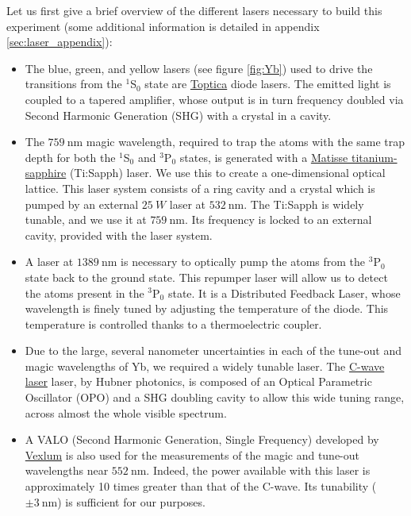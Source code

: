 \documentclass[11pt]{article}
\numberwithin{equation}{section}
\numberwithin{figure}{section}
\begin{document}
Let us first give a brief overview of the different lasers necessary to build this experiment (some additional information is detailed in appendix \ref{sec:laser_appendix}):
\begin{itemize}
	\item The blue, green, and yellow lasers (see figure  \ref{fig:Yb}) used to drive the transitions from the $^1$S$_0$ state are \href{https://www.toptica.com/products/tunable-diode-lasers/frequency-converted-lasers/ta-shg-pro}{Toptica} diode lasers. The emitted light is coupled to a tapered amplifier, whose output is in turn frequency doubled via Second Harmonic Generation (SHG) with a crystal in a cavity.
	\item The $\SI{759}{\nano\metre}$ magic wavelength, required to trap the atoms with the same trap depth for both the $^1$S$_0$ and $^3$P$_0$ states, is generated with a \href{https://www.spectra-physics.com/f/matisse-2-tunable-ring-laser}{Matisse titanium-sapphire} (Ti:Sapph) laser. We use this to create a one-dimensional optical lattice. This laser system consists of a ring cavity and a  crystal which is pumped by an external $\SI{25}{W}$ laser at $\SI{532}{\nano\metre}$. The Ti:Sapph is widely tunable, and we use it at $\SI{759}{\nano\metre}$. Its frequency is locked to an external cavity, provided with the laser system.	
	\item A laser at $\SI{1389}{\nano\metre}$ is necessary to optically pump the atoms from the  $^3$P$_0$ state back to the ground state. This repumper laser will allow us to detect the atoms present in the  $^3$P$_0$ state. It is a Distributed Feedback Laser, whose wavelength is finely tuned by adjusting the temperature of the diode. This temperature is controlled thanks to a thermoelectric coupler. 
	\item Due to the large, several nanometer uncertainties in each of the tune-out and magic wavelengths of Yb, we required a widely tunable laser. The \href{https://hubner-photonics.com/products/lasers/tunable-lasers/c-wave/}{C-wave laser} laser, by Hubner photonics, is composed of an Optical Parametric Oscillator (OPO) and a SHG doubling cavity to allow this wide tuning range, across almost the whole visible spectrum.
	\item A VALO (Second Harmonic Generation, Single Frequency) developed by \href{https://vexlum.com/products/}{Vexlum} is also used for the measurements of the magic and tune-out wavelengths near $\SI{552}{\nano\metre}$. Indeed, the power available with this laser is approximately 10 times greater than that of the C-wave. Its tunability ($\pm \SI{3}{\nano\metre}$) is sufficient for our purposes.
\end{itemize}
%
\end{document}
